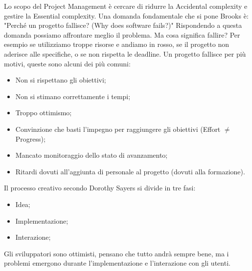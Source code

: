 Lo scopo del Project Management è cercare di ridurre la Accidental complexity e gestire la Essential complexity.\newline
Una domanda fondamentale che si pone Brooks è: "Perché un progetto fallisce? (Why does software fails?)"\newline
Rispondendo a questa domanda possiamo affrontare meglio il problema. Ma cosa significa fallire? Per esempio se utilizziamo troppe risorse e andiamo in rosso, se il progetto non aderisce alle specifiche, o se non rispetta le deadline.\newline
Un progetto fallisce per più motivi, queste sono alcuni dei più comuni:
\begin{itemize}
	\item Non si rispettano gli obiettivi;
	\item Non si stimano correttamente i tempi;
	\item Troppo ottimismo;
	\item Convinzione che basti l'impegno per raggiungere gli obiettivi (Effort $\neq$ Progress);
	\item Mancato monitoraggio dello stato di avanzamento;
	\item Ritardi dovuti all'aggiunta di personale al progetto (dovuti alla formazione).
\end{itemize}
Il processo creativo secondo Dorothy Sayers si divide in tre fasi:
\begin{itemize}
	\item Idea;
	\item Implementazione;
	\item Interazione;
\end{itemize}
Gli sviluppatori sono ottimisti, pensano che tutto andrà sempre bene, ma i problemi emergono durante  l'implementazione e l'interazione con gli utenti.
